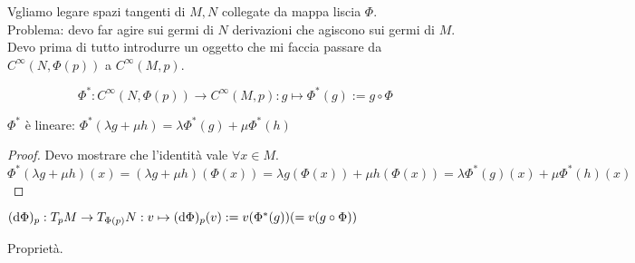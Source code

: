 Vgliamo legare spazi tangenti di $M,N$ collegate da mappa liscia
$\Phi$.\\
Problema: devo far agire sui germi di $N$ derivazioni che agiscono
sui germi di $M$. Devo prima di tutto introdurre un oggetto che mi
faccia passare da
$C^\infty(N,\Phi(p))$ a
$C^\infty(M,p)$.
\begin{definition}
    \begin{displaymath}
        \Phi^*:C^\infty(N,\Phi(p))\rightarrow C^\infty(M,p):
        g\mapsto \Phi^*(g):=g\circ\Phi
    \end{displaymath}
\end{definition}
\begin{obs}
    $\Phi^*$ è lineare: $\Phi^*(\lambda g+\mu h)=\lambda\Phi^*(g)+
    \mu\Phi^*(h)$
\end{obs}
\begin{proof}
    Devo mostrare che l'identità vale $\forall x\in M$.  
    $\Phi^*(\lambda g+\mu h)(x)=(\lambda g+\mu h)(\Phi(x))= 
    \lambda g(\Phi(x))+\mu h(\Phi(x))=\lambda \Phi^*(g)(x)+\mu
    \Phi^*(h)(x)$
\end{proof}
\begin{definition}[Differenziale]
    $(\dd{\Phi})_{p}:T_pM\rightarrow T_{\Phi(p)}N:v\mapsto
    (\dd{\Phi})_{p}(v):=v(\Phi^*(g))(=v(g\circ\Phi))$
\end{definition}
Proprietà. 
